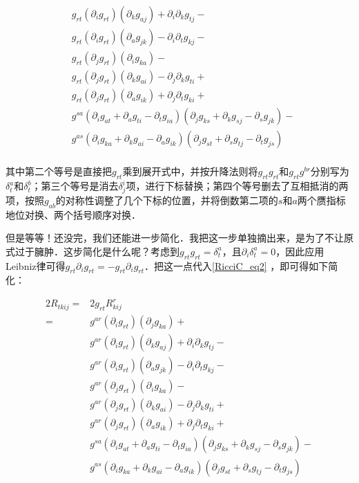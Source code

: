 \begin{equation}
\begin{aligned}
&g_{rt}(\partial_ig_{rt})(\partial_kg_{aj})+\partial_i\partial_kg_{tj}-\\
&g_{rt}(\partial_ig_{rt})(\partial_ag_{jk})-\partial_i\partial_tg_{kj}-\\%
&g_{rt}(\partial_jg_{rt})(\partial_ig_{ka})-\\
&g_{rt}(\partial_jg_{rt})(\partial_kg_{ai})-\partial_j\partial_kg_{ti}+\\
&g_{rt}(\partial_jg_{rt})(\partial_ag_{ik})+\partial_j\partial_tg_{ki}+\\%
&g^{sa}(\partial_ig_{at}+\partial_ag_{ti}-\partial_tg_{ia})(\partial_jg_{ks}+\partial_kg_{sj}-\partial_sg_{jk})-\\
&g^{as}(\partial_ig_{ka}+\partial_kg_{ai}-\partial_ag_{ik})(\partial_jg_{st}+\partial_sg_{tj}-\partial_tg_{js})\\
\end{aligned}
\end{equation}

其中第二个等号是直接把$g_{rt}$乘到展开式中，并按升降法则将$g_{rt}g_{rt}$和$g_{rt}g^{br}$分别写为$\delta^a_t$和$\delta^b_t$；第三个等号是消去$\delta^i_j$项，进行下标替换；第四个等号删去了互相抵消的两项，按照$g_{ab}$的对称性调整了几个下标的位置，并将倒数第二项的$s$和$a$两个赝指标地位对换、两个括号顺序对换．

但是等等！还没完，我们还能进一步简化．我把这一步单独摘出来，是为了不让原式过于臃肿．这步简化是什么呢？考虑到$g_{rt}g_{rt}=\delta^a_t$，且$\partial_i\delta^a_t=0$，因此应用Leibniz律可得$g_{rt}\partial_ig_{rt}=-g_{rt}\partial_ig_{rt}$．把这一点代入\autoref{RicciC_eq2} ，即可得如下简化：

\begin{equation}\label{RicciC_eq3}
\begin{aligned}
2R_{tkij}=&2g_{rt}R^r_{kij}\\
=&g^{ar}(\partial_ig_{rt})(\partial_jg_{ka})+\\
&g^{ar}(\partial_ig_{rt})(\partial_kg_{aj})+\partial_i\partial_kg_{tj}-\\
&g^{ar}(\partial_ig_{rt})(\partial_ag_{jk})-\partial_i\partial_tg_{kj}-\\%
&g^{ar}(\partial_jg_{rt})(\partial_ig_{ka})-\\
&g^{ar}(\partial_jg_{rt})(\partial_kg_{ai})-\partial_j\partial_kg_{ti}+\\
&g^{ar}(\partial_jg_{rt})(\partial_ag_{ik})+\partial_j\partial_tg_{ki}+\\%
&g^{sa}(\partial_ig_{at}+\partial_ag_{ti}-\partial_tg_{ia})(\partial_jg_{ks}+\partial_kg_{sj}-\partial_sg_{jk})-\\
&g^{as}(\partial_ig_{ka}+\partial_kg_{ai}-\partial_ag_{ik})(\partial_jg_{st}+\partial_sg_{tj}-\partial_tg_{js})\\
\end{aligned}
\end{equation}


